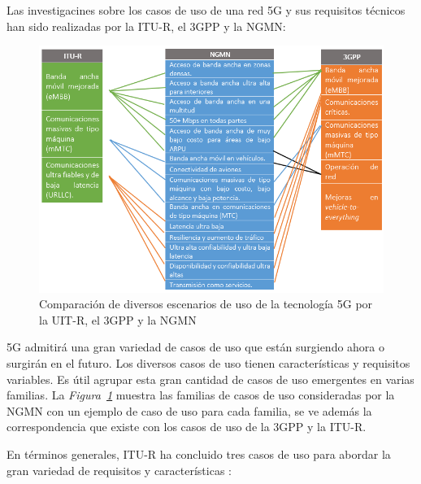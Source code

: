 Las investigacines sobre los casos de uso de una red 5G y sus requisitos técnicos han sido realizadas por la ITU-R, el 3GPP y la NGMN:

\begin{figure}[th]
\centering
\includegraphics[scale=1]{Figures/Comparación de diversos escenarios de uso de la tecnología 5G}
\decoRule
\caption[Comparación de diversos escenarios de uso de la tecnología 5G por la UIT-R, el 3GPP y la NGMN]{Comparación de diversos escenarios de uso de la tecnología 5G por la UIT-R, el 3GPP y la NGMN}
\label{fig:5g}
\end{figure}

5G admitirá una gran variedad de casos de uso que están surgiendo ahora o surgirán en el futuro. Los diversos casos de uso tienen características y requisitos variables. Es útil agrupar esta gran cantidad de casos de uso emergentes en varias familias. La \textit{Figura~\ref{fig:5g}} muestra las familias de casos de uso consideradas por la NGMN con un ejemplo de caso de uso para cada familia, se ve además la correspondencia que existe con los casos de uso de la 3GPP y la ITU-R.\newline

En términos generales, ITU-R ha concluido tres casos de uso para abordar la gran variedad de requisitos y características \parencite{5gMobileComms}:

